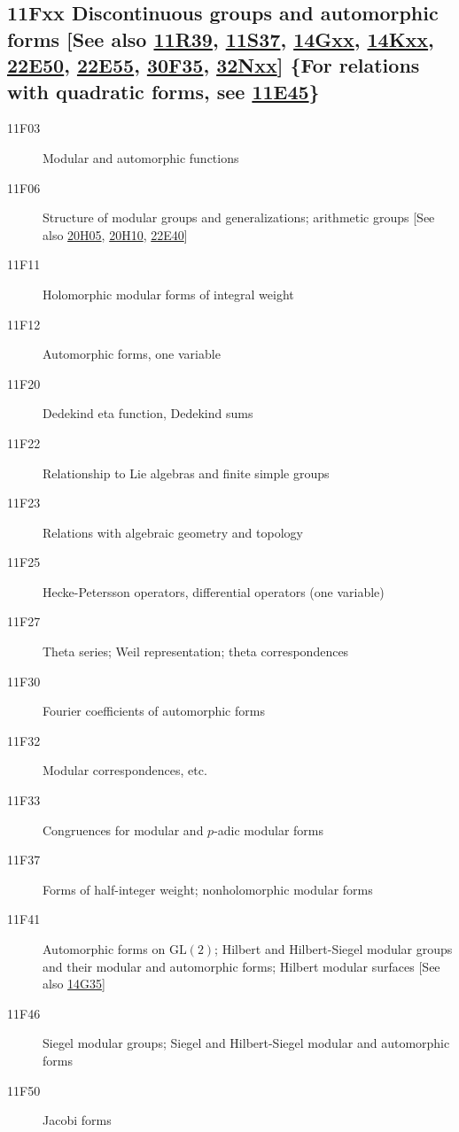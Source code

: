 \subsection*{11Fxx  Discontinuous groups and automorphic forms [See also \hyperref[11R39]{11R39}, \hyperref[11S37]{11S37}, \hyperref[14Gxx]{14Gxx}, \hyperref[14Kxx]{14Kxx}, \hyperref[22E50]{22E50}, \hyperref[22E55]{22E55}, \hyperref[30F35]{30F35}, \hyperref[32Nxx]{32Nxx}] \{For relations with quadratic forms, see \hyperref[11E45]{11E45}\} }\label{11Fxx}
\begin{description}  
\item [11F03]\label{11F03} Modular and automorphic functions
\item [11F06]\label{11F06} Structure of modular groups and generalizations; arithmetic groups [See also \hyperref[20H05]{20H05}, \hyperref[20H10]{20H10}, \hyperref[22E40]{22E40}]
\item [11F11]\label{11F11} Holomorphic modular forms of integral weight
\item [11F12]\label{11F12} Automorphic forms, one variable
\item [11F20]\label{11F20} Dedekind eta function, Dedekind sums
\item [11F22]\label{11F22} Relationship to Lie algebras and finite simple groups
\item [11F23]\label{11F23} Relations with algebraic geometry and topology
\item [11F25]\label{11F25} Hecke-Petersson operators, differential operators (one variable)
\item [11F27]\label{11F27} Theta series; Weil representation; theta correspondences
\item [11F30]\label{11F30} Fourier coefficients of automorphic forms
\item [11F32]\label{11F32} Modular correspondences, etc.
\item [11F33]\label{11F33} Congruences for modular and $p$-adic modular forms
\item [11F37]\label{11F37} Forms of half-integer weight; nonholomorphic modular forms
\item [11F41]\label{11F41} Automorphic forms on $\mbox{GL}(2)$; Hilbert and Hilbert-Siegel modular groups and their modular and automorphic forms; Hilbert modular surfaces [See also \hyperref[14G35]{14G35}]
\item [11F46]\label{11F46} Siegel modular groups; Siegel and Hilbert-Siegel modular and automorphic forms
\item [11F50]\label{11F50} Jacobi forms

\end{description}
